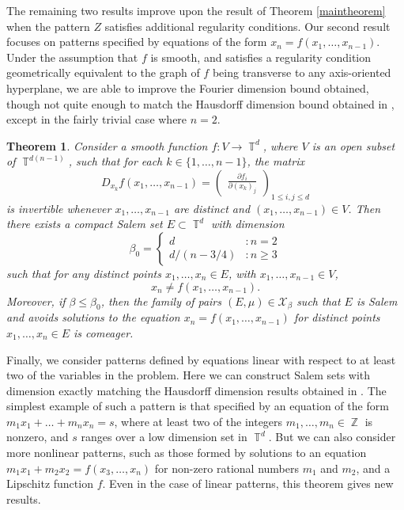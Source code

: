 \documentclass[dvipsnames,letterpaper,12pt]{article}
\numberwithin{equation}{section}
\DeclareMathOperator{\ZZ}{\mathbb{Z}}
\DeclareMathOperator{\TT}{\mathbb{T}}
\newtheorem{theorem}{Theorem}
\numberwithin{theorem}{section}
\begin{document}
The remaining two results improve upon the result of Theorem \ref{maintheorem} when the pattern $Z$ satisfies additional regularity conditions. Our second result focuses on patterns specified by equations of the form $x_n = f(x_1,\dots,x_{n-1})$. Under the assumption that $f$ is smooth, and satisfies a regularity condition geometrically equivalent to the graph of $f$ being transverse to any axis-oriented hyperplane, we are able to improve the Fourier dimension bound obtained, though not quite enough to match the Hausdorff dimension bound obtained in \cite{PramanikFraser}, except in the fairly trivial case where $n = 2$.

\begin{theorem} \label{theoremJOICVIOJVI122}
    Consider a smooth function $f: V \to \TT^d$, where $V$ is an open subset of $\TT^{d(n-1)}$, such that for each $k \in \{ 1, \dots, n-1 \}$, the matrix
    \[ D_{x_k} f(x_1,\dots,x_{n-1}) = \begin{pmatrix} \frac{\partial f_i}{\partial (x_k)_j} \end{pmatrix}_{1 \leq i,j \leq d} \]
    is invertible whenever $x_1,\dots,x_{n-1}$ are distinct and $(x_1,\dots,x_{n-1}) \in V$. Then there exists a compact Salem set $E \subset \TT^d$ with dimension
    \[ \beta_0 = \begin{cases} d &: n = 2 \\ d/(n - 3/4) &: n \geq 3 \end{cases} \]
    such that for any distinct points $x_1, \dots, x_n \in E$, with $x_1,\dots,x_{n-1} \in V$,
    \[ x_n \neq f(x_1,\dots,x_{n-1}). \]
    Moreover, if $\beta \leq \beta_0$, then the family of pairs $(E,\mu) \in \mathcal{X}_\beta$ such that $E$ is Salem and avoids solutions to the equation $x_n = f(x_1,\dots,x_{n-1})$ for distinct points $x_1,\dots,x_n \in E$ is comeager.
\end{theorem}

Finally, we consider patterns defined by equations linear with respect to at least two of the variables in the problem. Here we can construct Salem sets with dimension exactly matching the Hausdorff dimension results obtained in \cite{OurPaper}. The simplest example of such a pattern is that specified by an equation of the form $m_1x_1 + \dots + m_nx_n = s$, where at least two of the integers $m_1,\dots,m_n \in \ZZ$ is nonzero, and $s$ ranges over a low dimension set in $\TT^d$. But we can also consider more nonlinear patterns, such as those formed by solutions to an equation $m_1x_1 + m_2x_2 = f(x_3,\dots,x_n)$ for non-zero rational numbers $m_1$ and $m_2$, and a Lipschitz function $f$. Even in the case of linear patterns, this theorem gives new results.
\end{document}
